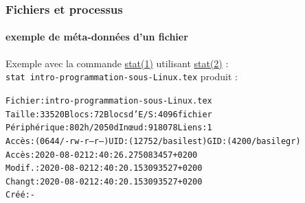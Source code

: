 \documentclass[xcolor=svgnames,final,smaller,a4]{beamer}
\begin{document}
\begin{frame}
  \frametitle{Fichiers et processus}
  \framesubtitle{exemple de méta-données d'un fichier}
  
        Exemple avec la commande
        \href{https://man7.org/linux/man-pages/man2/stat.1.html}{stat(1)}
        utilisant
        \href{https://man7.org/linux/man-pages/man2/stat.2.html}{stat(2)}
        : \\ \texttt{stat intro-programmation-sous-Linux.tex} produit
        :

        \begin{relsize}{-1}
        \begin{alltt}
          Fichier : intro-programmation-sous-Linux.tex\\
         Taille : 33520     	Blocs : 72         Blocs d'E/S : 4096   fichier \\
      Périphérique: 802h/2050d	Inœud: 918078      Liens: 1\\
      Accès: (0644/-rw-r--r--)  UID: (12752/basilest)   GID: ( 4200/basilegr)\\
      Accès: 2020-08-02 12:40:26.275083457 +0200\\
      Modif.: 2020-08-02 12:40:20.153093527 +0200\\
      Changt: 2020-08-02 12:40:20.153093527 +0200\\
        Créé: -
        \end{alltt}
        \end{relsize}
\end{frame}
\end{document}
